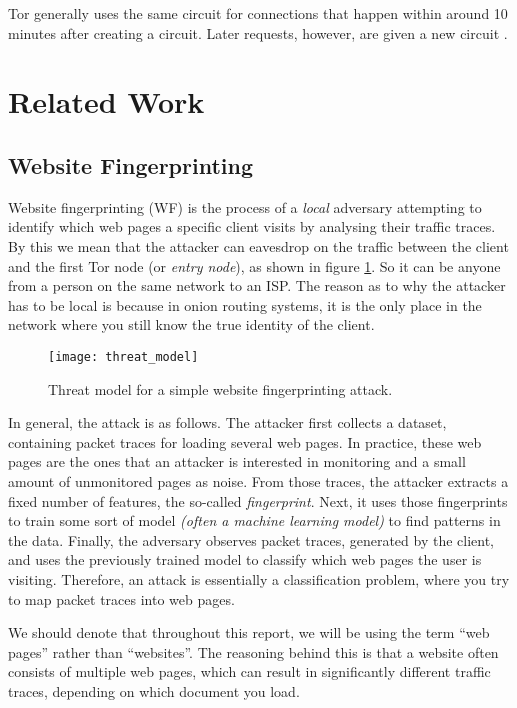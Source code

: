 Tor generally uses the same circuit for connections that happen within around 10 minutes after creating a circuit.
Later requests, however, are given a new circuit \cite{tor_project, tor_project2}.

\section{Related Work}

\subsection{Website Fingerprinting} \label{sec:related-work}

Website fingerprinting (WF) is the process of a \textit{local} adversary attempting to identify which web pages a specific client visits by analysing their traffic traces.
By this we mean that the attacker can eavesdrop on the traffic between the client and the first Tor node (or \textit{entry node}), as shown in figure \ref{fig:threat_model}.
So it can be anyone from a person on the same network to an ISP.
The reason as to why the attacker has to be local is because in onion routing systems, it is the only place in the network where you still know
the true identity of the client.

\begin{figure}[ht]
  \centering
  \texttt{[image: threat\_model]}
  \caption{Threat model for a simple website fingerprinting attack.}
  \label{fig:threat_model}
\end{figure}

In general, the attack is as follows. The attacker first collects a dataset, containing packet traces for loading several web pages.
In practice, these web pages are the ones that an attacker is interested in monitoring and a small amount of unmonitored pages as noise.
From those traces, the attacker extracts a fixed number of features, the so-called \textit{fingerprint}.
Next, it uses those fingerprints to train some sort of model \textit{(often a machine learning model)} to find patterns in the data.
Finally, the adversary observes packet traces, generated by the client, and uses the previously trained model to classify which web pages the user is visiting.
Therefore, an attack is essentially a classification problem, where you try to map packet traces into web pages.

We should denote that throughout this report, we will be using the term ``web pages'' rather than ``websites''.
The reasoning behind this is that a website often consists of multiple web pages,
which can result in significantly different traffic traces, depending on which document you load.

